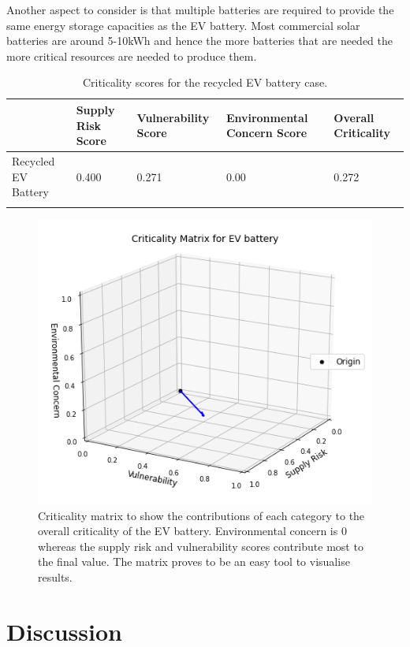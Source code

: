 \documentclass{article}
\begin{document}
Another aspect to consider is that multiple batteries are required to provide the same energy storage capacities as the EV battery. Most commercial solar batteries are around 5-10kWh and hence the more batteries that are needed the more critical resources are needed to produce them. 


\begin{longtable}{| p{} | p{} | p{} |p{} |p{} |}
\hline

{} & Supply Risk Score & Vulnerability Score & 
Environmental Concern Score & Overall Criticality\\\hline
{Recycled EV Battery} & {0.400} &
 {0.271} &
 {0.00}&
 {0.272}
 \\\hline

\caption{Criticality scores for the recycled EV battery case.}
\end{longtable}

\begin{figure}[hb]
    \centering
    \includegraphics[width=0.6\linewidth]{crit matric EV battery.png}
    \caption{Criticality matrix to show the contributions of each category to the overall criticality of the EV battery. Environmental concern is 0 whereas the supply risk and vulnerability scores contribute most to the final value. The matrix proves to be an easy tool to visualise results.}
    \label{fig:enter-label}
\end{figure}

\section{Discussion} 
\end{document}
